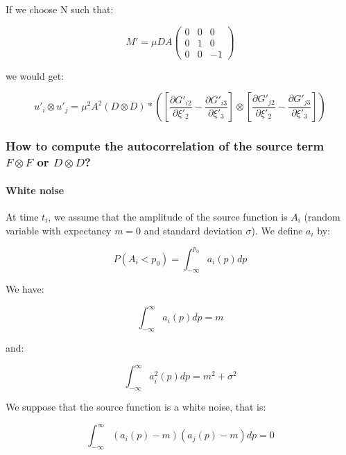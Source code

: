 \documentclass[main.tex]{subfiles}
\begin{document}
If we choose N such that:

\begin{equation}
M' = \mu D A \begin{pmatrix}
0 & 0 & 0 \\
0 & 1 & 0 \\
0 & 0 & -1
\end{pmatrix}
\end{equation}

we would get:

\begin{equation}
u'_i \otimes u'_j = \mu^2 A^2 (D \otimes D) * ([\frac{\partial G'_{i2}}{\partial \xi'_2} - \frac{\partial G'_{i3}}{\partial \xi'_3}] \otimes [\frac{\partial G'_{j2}}{\partial \xi'_2} - \frac{\partial G'_{j3}}{\partial \xi'_3}])
\end{equation}

\subsubsection{How to compute the autocorrelation of the source term $F \otimes F$ or $D \otimes D$?}

\paragraph{White noise}

At time $t_i$, we assume that the amplitude of the source function is $A_i$ (random variable with expectancy $m = 0$ and standard deviation $\sigma$). We define $a_i$ by:

\begin{equation}
P (A_i < p_0) = \int_{- \infty}^{p_0} a_i (p) dp
\end{equation}

We have:

\begin{equation}
\int_{- \infty}^{\infty} a_i (p) dp = m
\end{equation}

and:

\begin{equation}
\int_{- \infty}^{\infty} a_i^2 (p) dp = m^2 + \sigma ^2
\end{equation}

We suppose that the source function is a white noise, that is:

\begin{equation}
\int_{- \infty}^{\infty} (a_i (p) - m) (a_j (p) - m) dp = 0
\end{equation}
\end{document}
